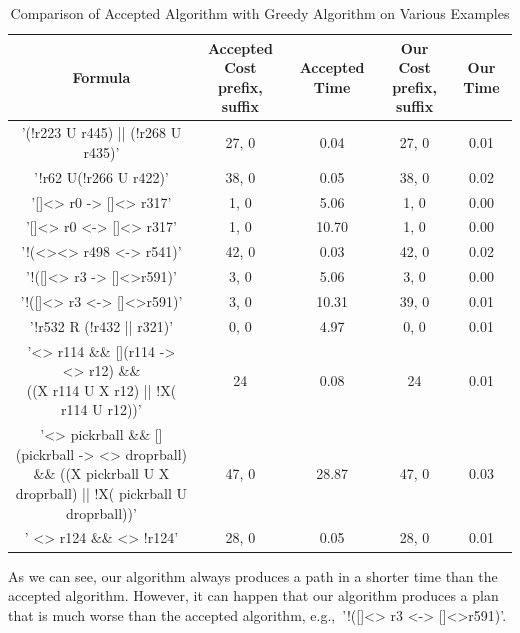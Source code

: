 \begin{landscape}
\begin{table}[]
\centering
\small
\begin{tabular}{|c|c|c|c|c|}
\hline
Formula & \makecell{Accepted Cost \\ prefix, suffix} & Accepted Time & \makecell{Our Cost \\ prefix, suffix} & Our Time \\ \hline
     '(!r223 U r445) || (!r268 U r435)'  &         27, 0     &      0.04         &      27, 0   &     0.01     \\ \hline
      '!r62 U(!r266 U r422)'  &         38, 0     &       0.05        &     38, 0     &     0.02     \\ \hline
       '[]<> r0 -> []<> r317' &         1, 0      &       5.06        &    1, 0      &    0.00     \\ \hline
       '[]<> r0 <-> []<> r317'  & 1, 0		&		10.70		& 1, 0 	&  0.00 \\ \hline 
      '!(<><> r498 <-> r541)' &	42, 0	&	0.03	&	42, 0	&	0.02	\\		\hline
      '!([]<> r3 -> []<>r591)' &	 3, 0	&	5.06 	&	3, 0 	&	0.00	\\		\hline
      '!([]<> r3 <-> []<>r591)' &	 3, 0	&	10.31	&	39, 0	&	0.01	\\		\hline
      '!r532 R (!r432 || r321)' &	 0, 0	&	4.97 	&	0, 0	&	0.01 	\\		\hline
     \makecell{ '<> r114 \&\& [](r114 -> <> r12) \&\& \\((X r114 U X r12) || !X( r114 U r12))' }&	24	&	0.08 	&	24	&	0.01	\\		\hline
   \makecell{ '<> pickrball \&\& [](pickrball -> <> droprball) \\ \&\& ((X pickrball U X droprball) || !X( pickrball U droprball))' } &	47, 0	&	28.87	&	47, 0	&	0.03	\\		\hline
      ' <> r124 \&\& <> !r124' &	28, 0	&	0.05 	&	28, 0	&	0.01	\\		\hline
\end{tabular}
\caption{Comparison of Accepted Algorithm with Greedy Algorithm on Various Examples}
\label{table}
\end{table}
\end{landscape}

As we can see, our algorithm always produces a path in a shorter time than the accepted algorithm. However, it can happen that our algorithm produces a plan that is much worse than the accepted algorithm, e.g.,\ '!([]<> r3 <-> []<>r591)'. 

